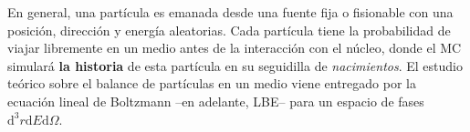 En general, una partícula es emanada desde una fuente fija o fisionable con una posición, dirección y energía aleatorias. Cada partícula tiene la probabilidad de viajar libremente en un medio antes de la interacción con el núcleo, donde el MC simulará \textbf{la historia} de esta partícula en su seguidilla de \emph{nacimientos}. El estudio teórico sobre el balance de partículas en un medio viene entregado por la ecuación lineal de Boltzmann --en adelante, LBE-- para un espacio de fases $\text{d}^3r \text{d}E \text{d}\Omega$. 


